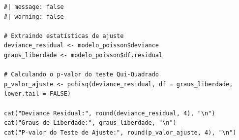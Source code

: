 \documentclass[
  letterpaper,
]{article}
\begin{document}
\begin{verbatim}
#| message: false
#| warning: false

# Extraindo estatísticas de ajuste
deviance_residual <- modelo_poisson$deviance
graus_liberdade <- modelo_poisson$df.residual

# Calculando o p-valor do teste Qui-Quadrado
p_valor_ajuste <- pchisq(deviance_residual, df = graus_liberdade, lower.tail = FALSE)

cat("Deviance Residual:", round(deviance_residual, 4), "\n")
cat("Graus de Liberdade:", graus_liberdade, "\n")
cat("P-valor do Teste de Ajuste:", round(p_valor_ajuste, 4), "\n")
\end{verbatim}
\end{document}
